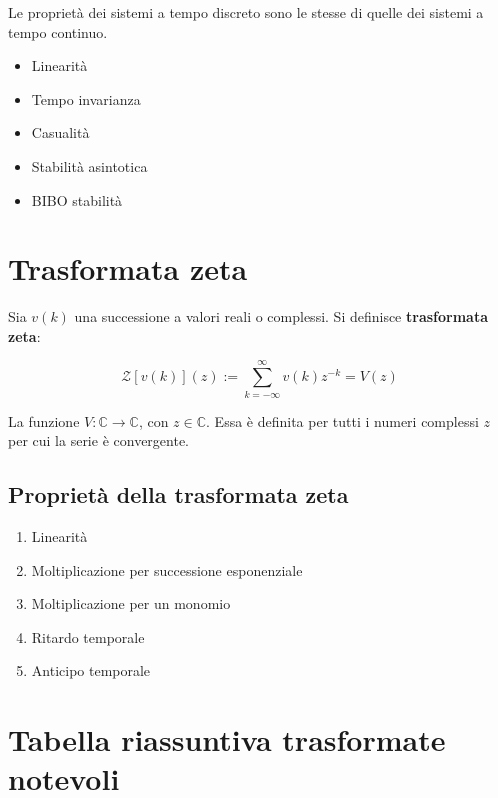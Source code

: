 \documentclass[a4paper]{article}
\newcommand{\Z}{\mathcal{Z}}
\begin{document}
	Le proprietà dei sistemi a tempo discreto sono le stesse di quelle dei sistemi a tempo continuo.
	
	\begin{itemize}
		\item Linearità
		\item Tempo invarianza
		\item Casualità
		\item Stabilità asintotica
		\item \textsc{BIBO} stabilità
	\end{itemize}

	\newpage

	\section{Trasformata zeta}
	
	Sia $v(k)$ una successione a valori reali o complessi. Si definisce \textbf{trasformata zeta}:
	
	\begin{equation}
		\Z [v(k)] (z) := \sum_{k=-\infty}^{\infty} v(k) z^{-k} = V(z)
	\end{equation}

	La funzione $V:\mathbb{C}\rightarrow\mathbb{C}$, con $z\in\mathbb{C}$. Essa è definita per tutti i numeri complessi $z$ per cui la serie è convergente.
	
	\subsection{Proprietà della trasformata zeta}
	
	\begin{enumerate}
		\item Linearità
		\item Moltiplicazione per successione esponenziale
		\item Moltiplicazione per un monomio
		\item Ritardo temporale
		\item Anticipo temporale
	\end{enumerate}
	
	\newpage
	
	\section{Tabella riassuntiva trasformate notevoli}
	
\end{document}
